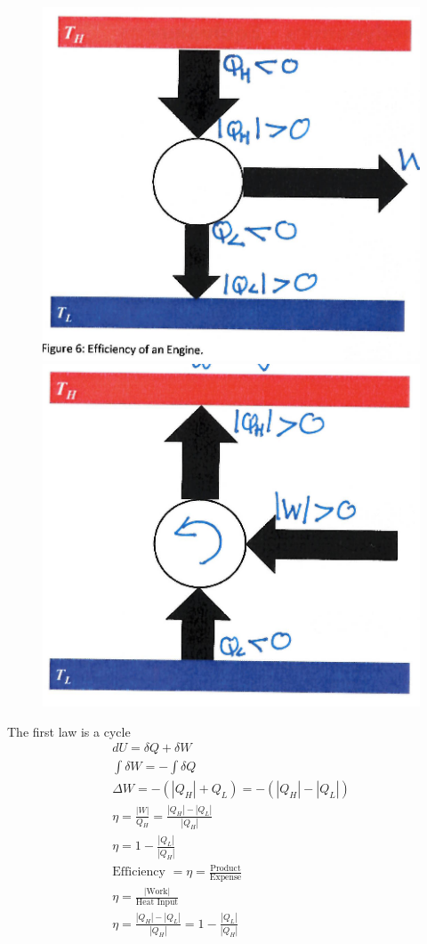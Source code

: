 \documentclass[a4paper, 11pt, normalem]{report}
\begin{document}
\begin{figure}
    \begin{center}
        \includegraphics[scale=0.4]{Efficient.png} \\
        \vspace{50pt}
        \includegraphics[scale=0.4]{CoP.png}
        \vspace{-160pt}
    \end{center}
\end{figure}
The first law is a cycle
\begin{gather*}
    dU = \delta Q + \delta W \\
    \int \delta W = - \int \delta Q \\
    \Delta W = - (|Q_H| + Q_L) = -(|Q_H| - |Q_L|) \\
    \eta = \frac{|W|}{Q_H} = \frac{|Q_H| - |Q_L|}{|Q_H|} \\
    \eta = 1 - \frac{|Q_L|}{|Q_H|} \\
    \text{Efficiency } = \eta = \frac{\text{Product}}{\text{Expense}} \\
    \eta = \frac{|\text{Work}|}{\text{Heat Input}} \\
    \eta = \frac{|Q_H| - |Q_L|}{|Q_{H}|} = 1 - \frac{|Q_L|}{|Q_H|}
\end{gather*}
\end{document}
